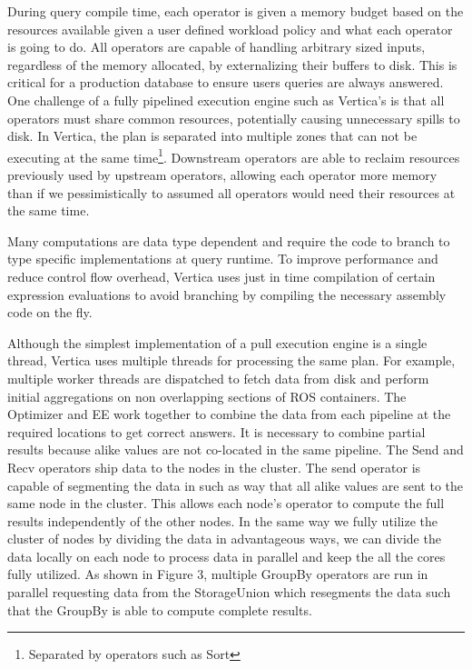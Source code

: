 \documentclass[a4paper,12pt,notitlepage,twoside,openright]{article}
\begin{document}
During query compile time, each operator is given a memory budget based
on the resources available given a user defined workload policy and what
each operator is going to do. All operators are capable of handling
arbitrary sized inputs, regardless of the memory allocated, by
externalizing their buffers to disk. This is critical for a production
database to ensure users queries are always answered. One challenge of a
fully pipelined execution engine such as Vertica's is that all operators
must share common resources, potentially causing unnecessary spills to
disk. In Vertica, the plan is separated into multiple zones that can not
be executing at the same time\footnote{Separated by operators such as
  Sort}. Downstream operators are able to reclaim resources previously
used by upstream operators, allowing each operator more memory than if
we pessimistically to assumed all operators would need their resources
at the same time.

Many computations are data type dependent and require the code to branch
to type specific implementations at query runtime. To improve
performance and reduce control flow overhead, Vertica uses just in time
compilation of certain expression evaluations to avoid branching by
compiling the necessary assembly code on the fly.

Although the simplest implementation of a pull execution engine is a
single thread, Vertica uses multiple threads for processing the same
plan. For example, multiple worker threads are dispatched to fetch data
from disk and perform initial aggregations on non overlapping sections
of ROS containers. The Optimizer and EE work together to combine the
data from each pipeline at the required locations to get correct
answers. It is necessary to combine partial results because alike values
are not co-located in the same pipeline. The Send and Recv operators
ship data to the nodes in the cluster. The send operator is capable of
segmenting the data in such as way that all alike values are sent to the
same node in the cluster. This allows each node's operator to compute
the full results independently of the other nodes. In the same way we
fully utilize the cluster of nodes by dividing the data in advantageous
ways, we can divide the data locally on each node to process data in
parallel and keep the all the cores fully utilized. As shown in Figure
3, multiple GroupBy operators are run in parallel requesting data from
the StorageUnion which resegments the data such that the GroupBy is able
to compute complete results.
\end{document}
